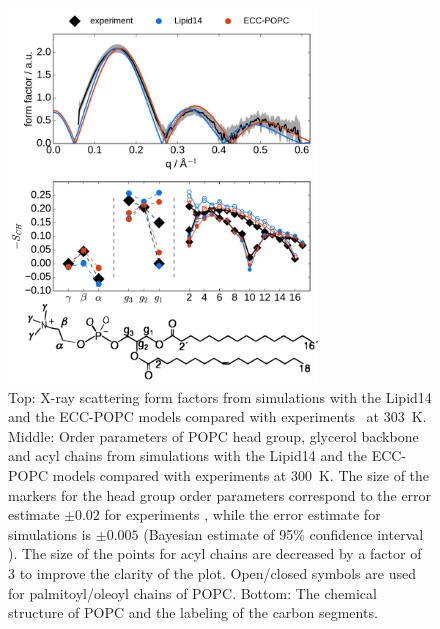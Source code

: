 \begin{figure}[tb!] 
  \centering 
  \includegraphics[width=8.2cm]{../img/ecc_popc/Order-parameters_form-factors_exp-L14-ECCL17_q80_sig89_POPC-struct.pdf} 
  \caption{ \label{simVSexpNOions} 
    Top: X-ray scattering form factors from simulations with the Lipid14 \citep{dickson14} and 
    the ECC-POPC models compared with experiments~\citep{kucerka11} at 303~K. 
    Middle: Order parameters of POPC head group, glycerol backbone and acyl chains  
    from simulations with the Lipid14 \citep{dickson14} and the ECC-POPC models 
    compared with experiments \citep{ferreira13} at 300~K. 
    The size of the markers for the head group order parameters correspond to 
    the error estimate $\pm 0.02$ for experiments \citep{botan15,ollila16}, 
    while the error estimate for simulations is $\pm 0.005$
    (Bayesian estimate of 95\% confidence interval \citep{scipy}).
    The size of the points for acyl chains are decreased by a factor of 3 to improve the clarity of the plot.
    Open/closed symbols are used for palmitoyl/oleoyl chains of POPC. 
    Bottom: The chemical structure of POPC and the labeling of the carbon segments. 
  }  
\end{figure} 



